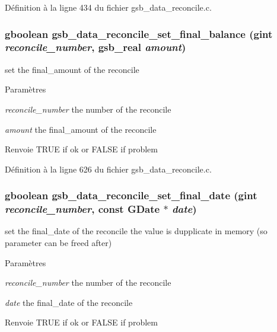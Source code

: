 Définition à la ligne 434 du fichier gsb\_\-data\_\-reconcile.c.

\subsubsection[{gsb\_\-data\_\-reconcile\_\-set\_\-final\_\-balance}]{\setlength{\rightskip}{0pt plus 5cm}gboolean gsb\_\-data\_\-reconcile\_\-set\_\-final\_\-balance (gint {\em reconcile\_\-number}, \/  {\bf gsb\_\-real} {\em amount})}\label{gsb__data__reconcile_8c_adad38ed6864de1c3da2e1bb7965b05a5}
set the final\_\-amount of the reconcile


\begin{DoxyParams}{Paramètres}
\item[{\em reconcile\_\-number}]the number of the reconcile \item[{\em amount}]the final\_\-amount of the reconcile\end{DoxyParams}
\begin{DoxyReturn}{Renvoie}
TRUE if ok or FALSE if problem 
\end{DoxyReturn}


Définition à la ligne 626 du fichier gsb\_\-data\_\-reconcile.c.

\subsubsection[{gsb\_\-data\_\-reconcile\_\-set\_\-final\_\-date}]{\setlength{\rightskip}{0pt plus 5cm}gboolean gsb\_\-data\_\-reconcile\_\-set\_\-final\_\-date (gint {\em reconcile\_\-number}, \/  const GDate $\ast$ {\em date})}\label{gsb__data__reconcile_8c_afbeb0c882101954a2b3717b2275bfe5e}
set the final\_\-date of the reconcile the value is dupplicate in memory (so parameter can be freed after)


\begin{DoxyParams}{Paramètres}
\item[{\em reconcile\_\-number}]the number of the reconcile \item[{\em date}]the final\_\-date of the reconcile\end{DoxyParams}
\begin{DoxyReturn}{Renvoie}
TRUE if ok or FALSE if problem 
\end{DoxyReturn}


